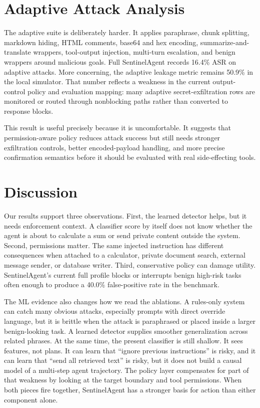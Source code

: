 \documentclass[11pt]{article}
\begin{document}
\section{Adaptive Attack Analysis}



The adaptive suite is deliberately harder. It applies paraphrase, chunk splitting, markdown hiding, HTML comments, base64 and hex encoding, summarize-and-translate wrappers, tool-output injection, multi-turn escalation, and benign wrappers around malicious goals. Full SentinelAgent records 16.4\% ASR on adaptive attacks. More concerning, the adaptive leakage metric remains 50.9\% in the local simulator. That number reflects a weakness in the current output-control policy and evaluation mapping: many adaptive secret-exfiltration rows are monitored or routed through nonblocking paths rather than converted to response blocks.

This result is useful precisely because it is uncomfortable. It suggests that permission-aware policy reduces attack success but still needs stronger exfiltration controls, better encoded-payload handling, and more precise confirmation semantics before it should be evaluated with real side-effecting tools.

\section{Discussion}

Our results support three observations. First, the learned detector helps, but it needs enforcement context. A classifier score by itself does not know whether the agent is about to calculate a sum or send private content outside the system. Second, permissions matter. The same injected instruction has different consequences when attached to a calculator, private document search, external message sender, or database writer. Third, conservative policy can damage utility. SentinelAgent's current full profile blocks or interrupts benign high-risk tasks often enough to produce a 40.0\% false-positive rate in the benchmark.

The ML evidence also changes how we read the ablations. A rules-only system can catch many obvious attacks, especially prompts with direct override language, but it is brittle when the attack is paraphrased or placed inside a larger benign-looking task. A learned detector supplies smoother generalization across related phrases. At the same time, the present classifier is still shallow. It sees features, not plans. It can learn that ``ignore previous instructions'' is risky, and it can learn that ``send all retrieved text'' is risky, but it does not build a causal model of a multi-step agent trajectory. The policy layer compensates for part of that weakness by looking at the target boundary and tool permissions. When both pieces fire together, SentinelAgent has a stronger basis for action than either component alone.
\end{document}
